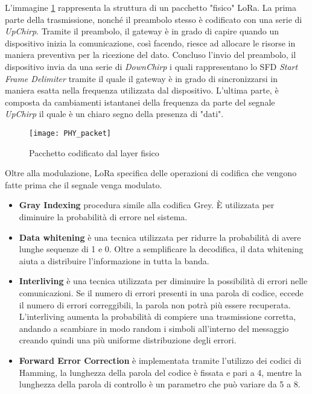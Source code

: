 L'immagine  \ref{fig:freq_lora_chirp} rappresenta la struttura di un  
pacchetto "fisico" LoRa.
La prima parte della trasmissione, nonché il preambolo  stesso è codificato con una
serie di \emph{UpChirp}. Tramite il preambolo, il gateway è in grado di capire
quando un dispositivo inizia la comunicazione, così facendo,  riesce ad
allocare le risorse in maniera preventiva per la ricezione del dato. 
Concluso l'invio del preambolo, il dispositivo invia  da una serie di
\emph{DownChirp} i quali rappresentano lo SFD \emph{Start Frame Delimiter} tramite il quale il gateway è in
grado di sincronizzarsi in maniera esatta nella frequenza utilizzata dal
dispositivo.
L'ultima parte, è composta da cambiamenti istantanei della frequenza da parte
del segnale \emph{UpChirp} il quale è un chiaro segno della presenza di "dati". 
\begin{figure}[h]
        \centering 
                \texttt{[image: PHY\_packet]}
        \caption{Pacchetto codificato dal layer fisico}
        \label{fig:freq_lora_chirp}
\end{figure}
Oltre alla modulazione, LoRa specifica delle operazioni di codifica che vengono
fatte prima che il segnale venga modulato.
\begin{itemize}
        \item   \textbf{Gray Indexing} procedura simile alla codifica Grey. È
                utilizzata per diminuire la probabilità di errore nel sistema.
        \item   \textbf{Data whitening} è una tecnica utilizzata per ridurre la
                probabilità di avere lunghe sequenze di 1 e 0. Oltre a semplificare la
                decodifica, il data whitening aiuta a distribuire l'informazione in tutta la
                banda.
        \item   \textbf{Interliving} è una tecnica utilizzata per diminuire la
                possibilità di errori nelle comunicazioni. Se il numero di errori
                presenti in una parola di codice, eccede il numero di errori
                correggibili, la parola non potrà più essere recuperata. L'interliving
                aumenta la probabilità di compiere una trasmissione corretta, andando a
                scambiare in modo random i simboli all'interno del messaggio creando
                quindi una più uniforme distribuzione degli errori.
        \item   \textbf{Forward Error Correction} è implementata tramite
                l'utilizzo dei codici di Hamming, la lunghezza della parola del codice è
                fissata e pari a 4, mentre la lunghezza della parola di
                controllo è un parametro che può variare da 5 a 8.
\end{itemize}
